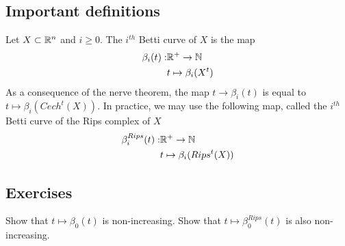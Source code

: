 \subsection{Important definitions}

\begin{definition}
    Let $X \subset \mathbb{R}^n$ and $i \ge 0$. The $i^{th}$ Betti curve of $X$ is the
    map
    \begin{align*}
        \beta_i(t) : &\mathbb{R}^+ \to \mathbb{N} \\
        &t \mapsto \beta_i(X^t)     
    \end{align*}
    As a consequence of the nerve theorem, the map $t \to \beta_i(t)$ is equal
    to $t \mapsto \beta_i(Cech^t(X)).$ In practice, we may use the following
    map, called the $i^{th}$ Betti curve of the Rips complex of $X$ 
    \begin{align*}
        \beta_i^{Rips}(t) : &\mathbb{R}^+ \to \mathbb{N} \\
        &t \mapsto \beta_i(Rips^t(X))     
    \end{align*}
\end{definition}


\subsection{Exercises}

\begin{exercise}
    Show that $t \mapsto \beta_0(t)$ is non-increasing. Show that $t \mapsto
    \beta_0^{Rips}(t)$ is also non-increasing.
\end{exercise}

